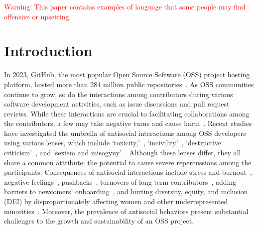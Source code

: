 {\small \textcolor{red}{ Warning: This paper contains examples of language that some people may find offensive or upsetting.} }

\section{Introduction}
\label{sec:intro}
In 2023, GitHub, the most popular Open Source Software (OSS) project hosting platform, hosted more than 284 million public repositories~\cite{octoverse-2023}.  As OSS communities continue to grow, so do the interactions among contributors during various software development activities, such as issue discussions and pull request reviews. 
While these interactions are crucial to facilitating collaborations among the contributors, a few may take negative turns and cause harm~\cite{GitHub_GitHub_Open_Source}. 
Recent studies have investigated the umbrella of antisocial interactions among OSS developers using various lenses, which include  `toxicity,'~\cite{miller2022did, sarker2022automated,sarker2020benchmark,raman2020stress,sarker-esem-2023}, `incivility'~\cite{ferreira2021shut}, `destructive criticism'~\cite{gunawardena2022destructive}, and `sexism and misogyny'~\cite{sultana2021rubric}. Although these lenses differ, they all share a common attribute: the potential to cause severe repercussions among the participants. Consequences of antisocial interactions include stress and burnout~\cite{raman2020stress}, negative feelings~\cite{egelman2020predicting,ferreira2021shut,gunawardena2022destructive}, pushbacks~\cite{murphy2022pushback}, turnovers of long-term contributors~\cite{toxic-blog-linux2, toxic-open-source-maintainer, perl-toxic-2,leaving-for-toxicity}, adding barriers to newcomers' onboarding~\cite{raman2020stress}, and hurting diversity, equity, and inclusion (DEI) by disproportionately affecting women and other underrepresented minorities~\cite{gunawardena2022destructive,albusays2021diversity,nafus2012patches,murphy2022pushback}. Moreover, the prevalence of antisocial behaviors present substantial challenges to the growth and sustainability of an OSS project.




